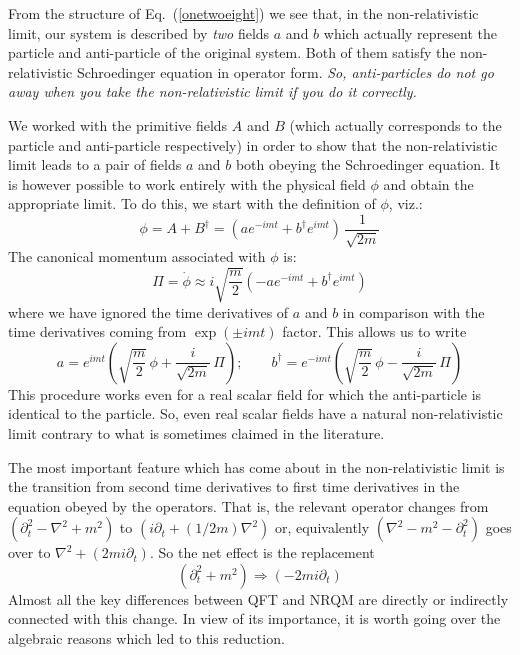 \documentclass[12pt]{article}
\def\eq#1{{Eq.~(\ref{#1})}}
\begin{document}
  From the structure of \eq{onetwoeight} we see that, in the non-relativistic limit, our system is described by \textit{two} fields $a$ and $b$ which actually represent the particle and anti-particle of the original system. Both of them satisfy the non-relativistic Schroedinger equation in operator form. \textit{So, anti-particles do not go away when you take the non-relativistic limit if you do it correctly. }
  
  We worked with the primitive fields $A$ and $B$ (which actually corresponds to the particle and anti-particle respectively) in order to show that the non-relativistic limit leads to a pair of fields $a$ and $b$ both obeying the Schroedinger equation. It is however possible to work entirely with the physical field $\phi$ and obtain the appropriate limit. To do this, we start with the definition of $\phi$, viz.: 
\begin{equation}
 \phi= A + B^\dagger = \left( a e^{-imt} + b^\dagger e^{imt}\right) \, \frac{1}{\sqrt{2m}}
\end{equation}
  The canonical momentum associated with $\phi$ is:
\begin{equation}
 \Pi = \dot \phi \approx i \sqrt{\frac{m}{2}} \left( -a e^{-imt} + b^\dagger e^{imt}\right) 
\end{equation} 
 where we have ignored the time derivatives of $a$ and $b$ in comparison with the time derivatives coming from $\exp(\pm imt)$ factor. This allows us to write 
\begin{equation}
 a =  e^{imt} \left(\sqrt{\frac{m}{2}}\, \phi  + \frac{i}{\sqrt{2m}} \, \Pi\right); \qquad
  b^\dagger =  e^{-imt} \left(\sqrt{\frac{m}{2}}\, \phi  - \frac{i}{\sqrt{2m}} \, \Pi\right)
\end{equation} 
This procedure works even for a real scalar field for which the anti-particle is identical to the particle. So, even real scalar fields have a natural non-relativistic limit contrary to what is sometimes claimed in the literature.


 The most important feature which has come about in the non-relativistic limit is the transition from second time derivatives to first time derivatives in the equation obeyed by the operators. That is, the relevant operator changes from $(\partial_t^2-\nabla^2+m^2)$ to
 $(i\partial_t+(1/2m)\nabla^2)$ or, equivalently
 $(\nabla^2 -m^2-\partial_t^2)$ goes over to $ \nabla^2+(2mi\partial_t)$. So the net effect is the replacement
 \begin{equation}
  (\partial_t^2 +m^2)\Longrightarrow (-2mi\partial_t)
  \label{opchange}
 \end{equation} 
 Almost all the key differences between QFT and NRQM are directly or indirectly connected with this change. In view of its importance, it is worth going over the algebraic reasons which led to this reduction. 
 
\end{document}

